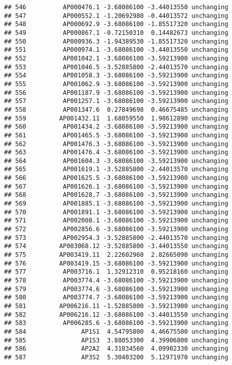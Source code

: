 \documentclass[]{article}
\begin{document}
\begin{verbatim}
## 546          AP000476.1 -3.68086100 -3.44013550 unchanging
## 547          AP000552.1 -1.20692980 -0.44013572 unchanging
## 548          AP000692.9 -3.68086100 -1.85517320 unchanging
## 549          AP000867.1 -0.72150310  0.14482673 unchanging
## 550          AP000936.3 -1.94389530 -1.85517320 unchanging
## 551          AP000974.1 -3.68086100 -3.44013550 unchanging
## 552          AP001042.1 -3.68086100 -3.59213900 unchanging
## 553          AP001046.5 -3.52885800 -2.44013570 unchanging
## 554          AP001058.3 -3.68086100 -3.59213900 unchanging
## 555          AP001062.9 -3.68086100 -3.59213900 unchanging
## 556          AP001187.9 -3.68086100 -3.59213900 unchanging
## 557          AP001257.1 -3.68086100 -3.59213900 unchanging
## 558          AP001347.6  0.27849698  0.46675485 unchanging
## 559         AP001432.11  1.68059550  1.98612890 unchanging
## 560          AP001434.2 -3.68086100 -3.59213900 unchanging
## 561          AP001465.5 -3.68086100 -3.59213900 unchanging
## 562          AP001476.3 -3.68086100 -3.59213900 unchanging
## 563          AP001476.4 -3.68086100 -3.59213900 unchanging
## 564          AP001604.3 -3.68086100 -3.59213900 unchanging
## 565          AP001619.1 -3.52885800 -2.44013570 unchanging
## 566          AP001625.5 -3.68086100 -3.59213900 unchanging
## 567          AP001626.1 -3.68086100 -3.59213900 unchanging
## 568          AP001628.7 -3.68086100 -3.59213900 unchanging
## 569          AP001885.1 -3.68086100 -3.59213900 unchanging
## 570          AP001891.1 -3.68086100 -3.59213900 unchanging
## 571          AP002008.1 -3.68086100 -3.59213900 unchanging
## 572          AP002856.6 -3.68086100 -3.59213900 unchanging
## 573          AP002954.3 -3.52885800 -2.44013570 unchanging
## 574         AP003068.12 -3.52885800 -3.44013550 unchanging
## 575         AP003419.11  2.22602960  2.82665090 unchanging
## 576         AP003419.15 -3.68086100 -3.59213900 unchanging
## 577          AP003716.1  1.32912310  0.95218160 unchanging
## 578          AP003774.4 -3.68086100 -3.59213900 unchanging
## 579          AP003774.6 -3.68086100 -3.59213900 unchanging
## 580          AP003774.7 -3.68086100 -3.59213900 unchanging
## 581         AP006216.11 -1.52885800 -3.59213900 unchanging
## 582         AP006216.12 -3.68086100 -3.44013550 unchanging
## 583          AP006285.6 -3.68086100 -3.59213900 unchanging
## 584               AP1S1  4.54795800  4.46675500 unchanging
## 585               AP1S3  3.88053300  4.39906800 unchanging
## 586               AP2A2  4.31034560  4.09902330 unchanging
## 587               AP3S2  5.30403200  5.12971970 unchanging

\end{verbatim}
\end{document}
